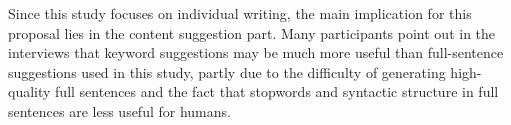 
Since this study focuses on individual writing, the main implication for this proposal lies in the content suggestion part. 
Many participants point out in the interviews that keyword suggestions may be much more useful than full-sentence suggestions used in this study, partly due to the difficulty of generating high-quality full sentences and the fact that stopwords and syntactic structure in full sentences are less useful for humans.
